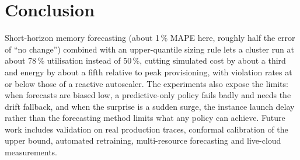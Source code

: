 \documentclass[11pt,a4paper]{article}
\begin{document}
\section{Conclusion}
Short-horizon memory forecasting (about 1\,\% MAPE here, roughly half the error of ``no change'') combined with an upper-quantile sizing rule lets a cluster run at about 78\,\% utilisation instead of 50\,\%, cutting simulated cost by about a third and energy by about a fifth relative to peak provisioning, with violation rates at or below those of a reactive autoscaler. The experiments also expose the limits: when forecasts are biased low, a predictive-only policy fails badly and needs the drift fallback, and when the surprise is a sudden surge, the instance launch delay rather than the forecasting method limits what any policy can achieve. Future work includes validation on real production traces, conformal calibration of the upper bound, automated retraining, multi-resource forecasting and live-cloud measurements.



\end{document}
